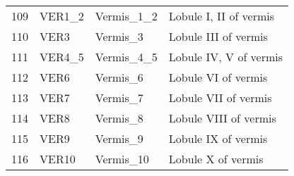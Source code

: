 \documentclass[12pt,reqno]{amsart}
\theoremstyle{definition}
\begin{document}
\begin{longtable}{rlll}
109 &      VER1\_2 &           Vermis\_1\_2 &                             Lobule I, II of vermis \\
110 &        VER3 &             Vermis\_3 &                               Lobule III of vermis \\
111 &      VER4\_5 &           Vermis\_4\_5 &                             Lobule IV, V of vermis \\
112 &        VER6 &             Vermis\_6 &                                Lobule VI of vermis \\
113 &        VER7 &             Vermis\_7 &                               Lobule VII of vermis \\
114 &        VER8 &             Vermis\_8 &                              Lobule VIII of vermis \\
115 &        VER9 &             Vermis\_9 &                                Lobule IX of vermis \\
116 &       VER10 &            Vermis\_10 &                                 Lobule X of vermis \\
\bottomrule
\end{longtable}
\end{document}
